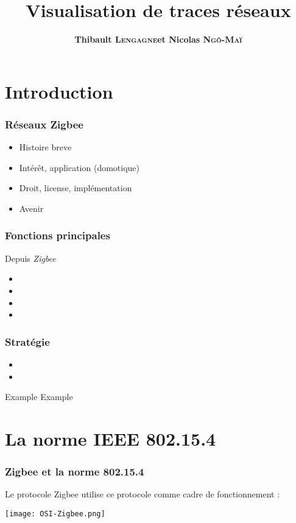 \documentclass{beamer}
\title[Visualisation de traces réseaux]{Visualisation de traces réseaux}
\author{\textbf{Thibault \textsc{Lengagne}et Nicolas \textsc{Ngô-Maï}}}
\institute{Centrale Supélec - Campus de Rennes}
\begin{document}
  \begin{frame}
    \titlepage
  \end{frame}
  

 \section{Introduction}
  \begin{frame}
   \frametitle{Réseaux Zigbee}
   \begin{itemize}
    \item Histoire breve
    \item Intérêt, application (domotique)
    \item Droit, license, implémentation
    \item Avenir

   \end{itemize}
  \end{frame}
  
  \begin{frame}
   \frametitle{Fonctions principales}
   Depuis \textit{Zigbee}
   \begin{itemize}
    \item 
    \item 
    \item 
    \item 
   \end{itemize}
  \end{frame}

  \begin{frame}
     \frametitle{Stratégie}
    \begin{itemize}
     \item 
     \item 
    \end{itemize}
    \begin{alertblock}{Example}
      Example
    \end{alertblock}
  \end{frame}
  
 \section{La norme IEEE 802.15.4}
  \begin{frame}
    \frametitle{Zigbee et la norme 802.15.4}
    Le protocole Zigbee utilise ce protocole comme cadre de fonctionnement :
      \begin{center}
       \texttt{[image: OSI-Zigbee.png]}
      \end{center}  
  \end{frame}
\end{document}
